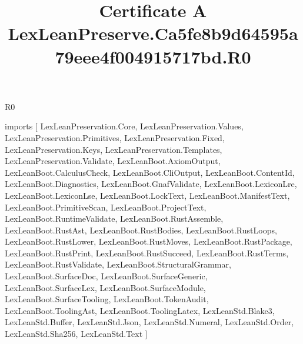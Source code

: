\begin{lexlean}{R0}
\title{Certificate A LexLeanPreserve.Ca5fe8b9d64595a79eee4f004915717bd.R0}
\begin{coremodule}
imports [
  LexLeanPreservation.Core,
  LexLeanPreservation.Values,
  LexLeanPreservation.Primitives,
  LexLeanPreservation.Fixed,
  LexLeanPreservation.Keys,
  LexLeanPreservation.Templates,
  LexLeanPreservation.Validate,
  LexLeanBoot.AxiomOutput,
  LexLeanBoot.CalculusCheck,
  LexLeanBoot.CliOutput,
  LexLeanBoot.ContentId,
  LexLeanBoot.Diagnostics,
  LexLeanBoot.GnafValidate,
  LexLeanBoot.LexiconLre,
  LexLeanBoot.LexiconLse,
  LexLeanBoot.LockText,
  LexLeanBoot.ManifestText,
  LexLeanBoot.PrimitiveScan,
  LexLeanBoot.ProjectText,
  LexLeanBoot.RuntimeValidate,
  LexLeanBoot.RustAssemble,
  LexLeanBoot.RustAst,
  LexLeanBoot.RustBodies,
  LexLeanBoot.RustLoops,
  LexLeanBoot.RustLower,
  LexLeanBoot.RustMoves,
  LexLeanBoot.RustPackage,
  LexLeanBoot.RustPrint,
  LexLeanBoot.RustSucceed,
  LexLeanBoot.RustTerms,
  LexLeanBoot.RustValidate,
  LexLeanBoot.StructuralGrammar,
  LexLeanBoot.SurfaceDoc,
  LexLeanBoot.SurfaceGeneric,
  LexLeanBoot.SurfaceLex,
  LexLeanBoot.SurfaceModule,
  LexLeanBoot.SurfaceTooling,
  LexLeanBoot.TokenAudit,
  LexLeanBoot.ToolingAst,
  LexLeanBoot.ToolingLatex,
  LexLeanStd.Blake3,
  LexLeanStd.Buffer,
  LexLeanStd.Json,
  LexLeanStd.Numeral,
  LexLeanStd.Order,
  LexLeanStd.Sha256,
  LexLeanStd.Text
]


\end{coremodule}
\end{lexlean}
